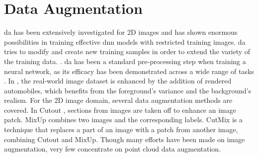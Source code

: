 \section{Data Augmentation}
\acrfull{da} has been extensively investigated for 2D images \parencite{transfsim2000, NIPS2000_ba9a56ce} and has shown enormous possibilities in training effective \acrshort{dnn} models with restricted training images. \acrshort{da} tries to modify and create new training samples in order to extend the variety of the training data. \parencite{xiao2022polarmix} . \acrshort{da} has been a standard pre-processing step when training a neural network, as its efficacy has been demonstrated across a wide range of tasks \parencite{lidar_aug, second2018, pointmixup2020}. In \parencite{abs-1708-01566}, the real-world image dataset is enhanced by the addition of rendered automobiles, which benefits from the foreground's variance and the background's realism. For the 2D image domain, several data augmentation methods are covered. In Cutout \parencite{cutout}, sections from images are taken off to enhance an image patch. MixUp \parencite{mixup} combines two images and the corresponding labels. CutMix \parencite{cutmix} is a technique that replaces a part of an image with a patch from another image, combining Cutout and MixUp. Though many efforts have been made on image augmentation, very few concentrate on point cloud data augmentation.

